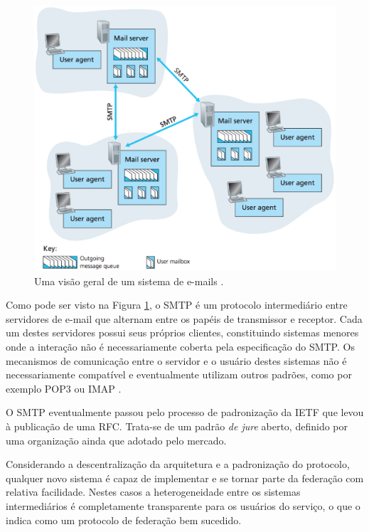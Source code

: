 \begin{apendicesenv}
\begin{figure}[h]
	\centering
		\includegraphics[keepaspectratio=true,scale=0.6]{figuras/smtp_internet.eps}
	\caption{Uma visão geral de um sistema de e-mails \cite{kurose2012}.}
	\label{fig:smtpInternet}
\end{figure}

Como pode ser visto na Figura \ref{fig:smtpInternet}, o SMTP é um protocolo
intermediário entre servidores de e-mail que alternam entre os papéis de transmissor
e receptor. Cada um destes servidores possui seus próprios clientes, constituindo
sistemas menores onde a interação não é necessariamente coberta pela especificação
do SMTP. Os mecanismos de comunicação entre o servidor e o usuário destes sistemas
não é necessariamente compatível e eventualmente utilizam outros padrões, como por
exemplo POP3 ou IMAP \cite{tanenbaum2010}.

O SMTP eventualmente passou pelo processo de padronização da IETF que levou à
publicação de uma RFC. Trata-se de um padrão \textit{de jure} aberto, definido por
uma organização ainda que adotado pelo mercado.

Considerando a descentralização da arquitetura e a padronização do protocolo,
qualquer novo sistema é capaz de implementar e se tornar parte da federação com
relativa facilidade. Nestes casos a heterogeneidade entre os sistemas intermediários
é completamente transparente para os usuários do serviço, o que o indica como um
protocolo de federação bem sucedido.


\end{apendicesenv}

